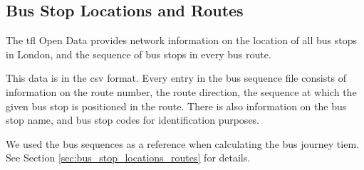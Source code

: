 \subsection{Bus Stop Locations and Routes}
\label{sec:bus_sequence}
\par The \acrshort{tfl} Open Data provides network information on the location of all bus stops in London, and the sequence of bus stops in every bus route.

\par This data is in the \acrfull{csv} format. Every entry in the bus sequence file consists of information on the route number, the route direction, the sequence at which the given bus stop is positioned in the route. There is also information on the bus stop name, and bus stop codes for identification purposes.

\par We used the bus sequences as a reference when calculating the bus journey tiem. See Section \ref{sec:bus_stop_locations_routes} for details.

